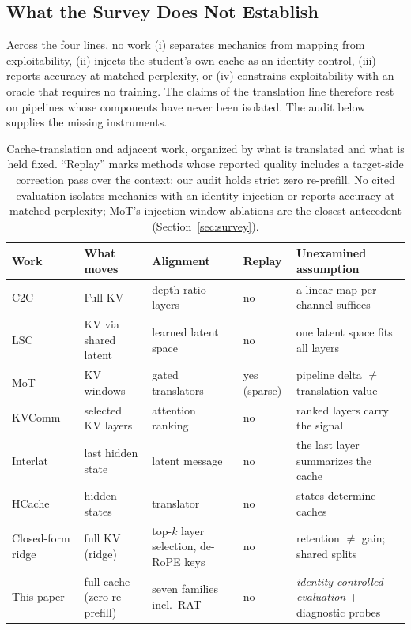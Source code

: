 \documentclass{article} %
\begin{document}
\subsection{What the Survey Does Not Establish}
Across the four lines, no work (i) separates mechanics from mapping from
exploitability, (ii) injects the student's own cache as an identity control,
(iii) reports accuracy at matched perplexity, or (iv) constrains exploitability
with an oracle that requires no training. The claims of the translation line
therefore rest on pipelines whose components have never been isolated. The
audit below supplies the missing instruments.

\begin{table}[t]
\centering
\small
\caption{Cache-translation and adjacent work, organized by what is
translated and what is held fixed. ``Replay'' marks methods whose reported
quality includes a target-side correction pass over the context; our audit
holds strict zero re-prefill. No cited evaluation isolates mechanics with an
identity injection or reports accuracy at matched perplexity; MoT's
injection-window ablations are the closest antecedent
(Section~\ref{sec:survey}).}
\label{tab:related}
\setlength{\tabcolsep}{4pt}
\begin{tabular}{p{2.6cm}p{2.2cm}p{2.4cm}p{1.6cm}p{3.2cm}}
\toprule
Work & What moves & Alignment & Replay & Unexamined assumption \\
\midrule
C2C~\citep{c2c2025} & Full KV & depth-ratio layers & no & a linear map per
channel suffices \\
LSC~\citep{lsc2026} & KV via shared latent & learned latent space & no &
one latent space fits all layers \\
MoT~\citep{mot2026} & KV windows & gated translators & yes (sparse) &
pipeline delta $\neq$ translation value \\
KVComm~\citep{kvcomm2025} & selected KV layers & attention ranking & no &
ranked layers carry the signal \\
Interlat~\citep{interlat2025} & last hidden state & latent message & no &
the last layer summarizes the cache \\
HCache~\citep{hcache2025} & hidden states & translator & no & states
determine caches \\
\midrule
Closed-form ridge~\citep{heo2026} & full KV (ridge) & top-$k$ layer selection, de-RoPE
keys & no & retention $\neq$ gain; shared splits \\
\midrule
This paper & full cache (zero re-prefill) & seven families incl.\ RAT & no &
\emph{identity-controlled evaluation} + diagnostic probes \\
\bottomrule
\end{tabular}
\end{table}
\end{document}

